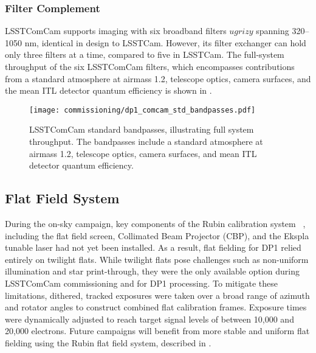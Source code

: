 \subsubsection{Filter Complement}
\label{sssec:comcam_filters}
LSSTComCam supports imaging with six broadband filters $ugrizy$ spanning 320–1050 nm, identical in design to LSSTCam. 
However, its filter exchanger can hold only three filters at a time, compared to five in LSSTCam. 
The full-system throughput of the six LSSTComCam filters, which encompasses contributions from a standard atmosphere at airmass 1.2, telescope optics, camera surfaces, and the mean ITL detector quantum efficiency is shown in .
\begin{figure}[htb!]
\centering
\texttt{[image: commissioning/dp1\_comcam\_std\_bandpasses.pdf]}
\caption{LSSTComCam standard bandpasses, illustrating full system throughput. The bandpasses include a standard atmosphere at airmass 1.2, telescope optics, camera surfaces, and mean ITL detector quantum efficiency.}
\label{fig:comcam_standard_bandpasses}
\vspace{0.1cm}
\end{figure}

\subsection{Flat Field System
\label{ssec:flat_field_system}}
During the on-sky campaign, key components of the Rubin calibration system ~\citep{2022SPIE12182E..0RI}, including the flat field screen, Collimated Beam Projector (CBP), and the Ekspla tunable laser had not yet been installed.
As a result, flat fielding for DP1 relied entirely on twilight flats. 
While twilight flats pose challenges such as non-uniform illumination and star print-through, they were the only available option during LSSTComCam commissioning and for DP1 processing.
To mitigate these limitations, dithered, tracked exposures were taken over a broad range of azimuth and rotator angles to construct combined flat calibration frames. 
Exposure times were dynamically adjusted to reach target signal levels of between 10,000 and 20,000 electrons.
Future campaigns will benefit from more stable and uniform flat fielding using the Rubin flat field system, described in \citet{SITCOMTN-086}.

